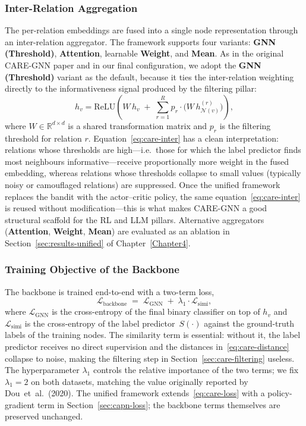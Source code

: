 \subsubsection{Inter-Relation Aggregation}
\label{sec:care-inter}

The per-relation embeddings are fused into a single node representation through an inter-relation aggregator. The framework supports four variants: \textbf{GNN (Threshold)}, \textbf{Attention}, learnable \textbf{Weight}, and \textbf{Mean}. As in the original CARE-GNN paper and in our final configuration, we adopt the \textbf{GNN (Threshold)} variant as the default, because it ties the inter-relation weighting directly to the informativeness signal produced by the filtering pillar:
\begin{equation}
h_v = \mathrm{ReLU}\!\left( W\, h_v \;+\; \sum_{r=1}^{R} p_r \cdot \bigl( W\, h^{(r)}_{\mathcal{N}(v)} \bigr) \right),
\label{eq:care-inter}
\end{equation}
where $W \in \mathbb{R}^{d \times d}$ is a shared transformation matrix and $p_r$ is the filtering threshold for relation $r$. Equation~\eqref{eq:care-inter} has a clean interpretation: relations whose thresholds are high---i.e.\ those for which the label predictor finds most neighbours informative---receive proportionally more weight in the fused embedding, whereas relations whose thresholds collapse to small values (typically noisy or camouflaged relations) are suppressed. Once the unified framework replaces the bandit with the actor--critic policy, the same equation~\eqref{eq:care-inter} is reused without modification---this is what makes CARE-GNN a good structural scaffold for the RL and LLM pillars. Alternative aggregators (\textbf{Attention}, \textbf{Weight}, \textbf{Mean}) are evaluated as an ablation in Section~\ref{sec:results-unified} of Chapter~\ref{Chapter4}.

\subsubsection{Training Objective of the Backbone}
\label{sec:care-loss}

The backbone is trained end-to-end with a two-term loss,
\begin{equation}
\mathcal{L}_{\mathrm{backbone}} \;=\; \mathcal{L}_{\mathrm{GNN}} \;+\; \lambda_1 \cdot \mathcal{L}_{\mathrm{simi}},
\label{eq:care-loss}
\end{equation}
where $\mathcal{L}_{\mathrm{GNN}}$ is the cross-entropy of the final binary classifier on top of $h_v$ and $\mathcal{L}_{\mathrm{simi}}$ is the cross-entropy of the label predictor~$S(\cdot)$ against the ground-truth labels of the training nodes. The similarity term is essential: without it, the label predictor receives no direct supervision and the distances in~\eqref{eq:care-distance} collapse to noise, making the filtering step in Section~\ref{sec:care-filtering} useless. The hyperparameter $\lambda_1$ controls the relative importance of the two terms; we fix $\lambda_1 = 2$ on both datasets, matching the value originally reported by Dou~et~al.~(2020). The unified framework extends~\eqref{eq:care-loss} with a policy-gradient term in Section~\ref{sec:capn-loss}; the backbone terms themselves are preserved unchanged.

